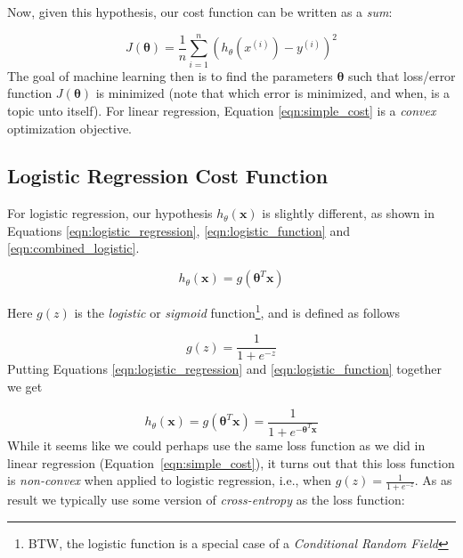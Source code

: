 \documentclass[11pt, oneside]{article}   	%
\begin{document}
\noindent
Now, given this hypothesis, our cost function can be written as a \textit{sum}:

\begin{equation}
J(\boldsymbol{\theta}) = \frac{1}{n}\sum\limits_{i = 1}^{n}(h{_\theta}(x^{(i)})- y^{(i)} )^2
\label{eqn:simple_cost}
\end{equation}
The goal of machine learning then is to find the parameters $\boldsymbol{\theta}$ such that loss/error function $J(\boldsymbol{\theta})$ is minimized (note that which error is minimized, and when, is a topic unto itself).  For linear regression, Equation \ref{eqn:simple_cost} is a \textit{convex} optimization objective.
 
 \subsection{Logistic Regression Cost Function} 

For logistic regression, our hypothesis $h_{\theta}(\boldsymbol{x})$ is slightly different, as shown in Equations \ref{eqn:logistic_regression}, \ref{eqn:logistic_function} and \ref{eqn:combined_logistic}.

 \begin{equation}
 h_{\theta}(\boldsymbol{x}) = g(\boldsymbol{\theta}^{T}\boldsymbol{x})
 \label{eqn:logistic_regression}
 \end{equation}
 
 \bigskip
 \noindent
Here  $g(z)$ is the \textit{logistic} or \textit{sigmoid} function\footnote{BTW, the logistic function is a special case of a \textit{Conditional Random Field}}, and is defined as follows
 
 
 \begin{equation}
 g(z) = \frac{1}{1+e^{-z}}
 \label{eqn:logistic_function}
 \end{equation}
 Putting Equations \ref{eqn:logistic_regression} and \ref{eqn:logistic_function} together we get

 \begin{equation}
  h_{\theta}(\boldsymbol{x}) = g(\boldsymbol{\theta}^{T}\boldsymbol{x}) = 
  \frac{1}{1+e^{-\boldsymbol{\theta}^{T}\boldsymbol{x}}}
 \label{eqn:combined_logistic}
 \end{equation}
While it seems like we could perhaps use the same loss function as we did in linear regression (Equation~\ref{eqn:simple_cost}), it turns out that this loss function is \textit{non-convex} when applied to logistic regression, i.e., when $g(z) = \frac{1}{1 +  e^{-z}}$. As as result we typically use some version of \textit{cross-entropy} as the loss function:
 
\end{document}
